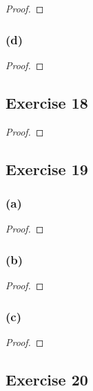 \documentclass[14pt]{extarticle}
\begin{document}
\begin{proof}

\end{proof}

\subsubsection{(d)}

\begin{proof}

\end{proof}

\subsection{Exercise 18}

\begin{proof}

\end{proof}

\subsection{Exercise 19}

\subsubsection{(a)}

\begin{proof}

\end{proof}

\subsubsection{(b)}

\begin{proof}

\end{proof}

\subsubsection{(c)}

\begin{proof}

\end{proof}

\subsection{Exercise 20}
\end{document}

